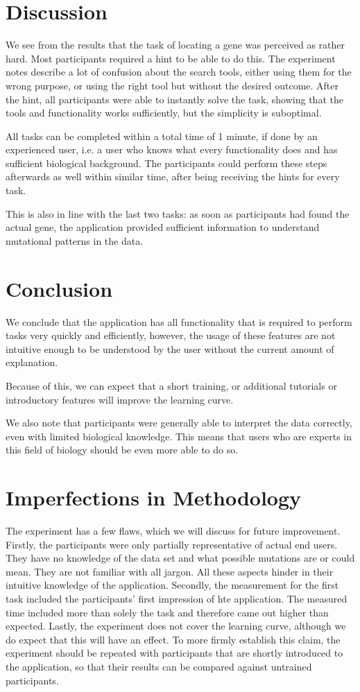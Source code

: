 \section{Discussion}
We see from the results that the task of locating a gene was perceived as rather hard. Most participants required a hint to be able to do this. The experiment notes describe a lot of confusion about the search tools, either using them for the wrong purpose, or using the right tool but without the desired outcome. After the hint, all participants were able to instantly solve the task, showing that the tools and functionality works sufficiently, but the simplicity is suboptimal.
\par
All tasks can be completed within a total time of 1 minute, if done by an experienced user, i.e. a user who knows what every functionality does and has sufficient biological background. The participants could perform these steps afterwards as well within similar time, after being receiving the hints for every task.
\par
This is also in line with the last two tasks: as soon as participants had found the actual gene, the application provided sufficient information to understand mutational patterns in the data.

\section{Conclusion}
We conclude that the application has all functionality that is required to perform tasks very quickly and efficiently, however, the usage of these features are not intuitive enough to be understood by the user without the current amount of explanation.
\par
Because of this, we can expect that a short training, or additional tutorials or introductory features will improve the learning curve.
\par
We also note that participants were generally able to interpret the data correctly, even with limited biological knowledge. This means that users who are experts in this field of biology should be even more able to do so. 
\section{Imperfections in Methodology}
The experiment has a few flaws, which we will discuss for future improvement.
Firstly, the participants were only partially representative of actual end users. They have no knowledge of the data set and what possible mutations are or could mean. They are not familiar with all jargon. All these aspects hinder in their intuitive knowledge of the application.
Secondly, the measurement for the first task included the participants’ first impression of hte application. The measured time included more than solely the task and therefore came out higher than expected.
Lastly, the experiment does not cover the learning curve, although we do expect that this will have an effect. To more firmly establish this claim, the experiment should be repeated with participants that are shortly introduced to the application, so that their results can be compared against untrained participants.
